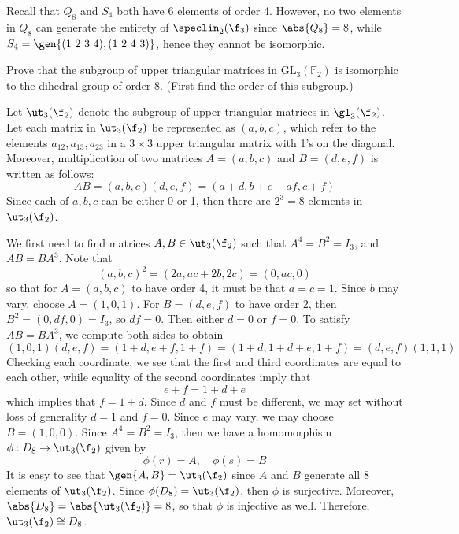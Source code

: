 \begin{sol}
    Recall that $Q_8$ and $S_4$ both have 6 elements of order 4. However, no two elements in $Q_8$ can generate the entirety of $\speclin_2(\f_3)$ since $\abs{Q_8} = 8$, while $S_4 = \gen{(1\ 2\ 3\ 4), (1\ 2\ 4\ 3)}$, hence they cannot be isomorphic.
\end{sol}


\begin{specialexercise}\label{ex2.4.12}
    Prove that the subgroup of upper triangular matrices in $\mathrm{GL}_3(\mathbb{F}_2)$ is isomorphic to the dihedral group of order $8$. (First find the order of this subgroup.)
\end{specialexercise}

\begin{sol}
    Let $\ut_3(\f_2)$ denote the subgroup of upper triangular matrices in $\gl_3(\f_2)$. Let each matrix in $\ut_3(\f_2)$ be represented as $(a, b, c)$, which refer to the elements $a{}_{12}, a_{13}, a_{23}$ in a $3 \times 3$ upper triangular matrix with 1's on the diagonal. Moreover, multiplication of two matrices $A = (a, b, c)$ and $B = (d, e, f)$ is written as follows:
    \[AB = (a, b, c)(d, e, f) = (a + d, b + e + af, c + f)\]
    Since each of $a, b, c$ can be either 0 or 1, then there are $2^3 = 8$ elements in $\ut_3(\f_2)$.

    We first need to find matrices $A, B \in \ut_3(\f_2)$ such that $A^4 = B^2 = I_3$, and $AB = BA^3$. Note that
    \[(a, b, c)^2 = (2a, ac + 2b, 2c) = (0, ac, 0)\]
    so that for $A = (a, b, c)$ to have order 4, it must be that $a = c = 1$. Since $b$ may vary, choose $A = (1, 0, 1)$. For $B = (d, e, f)$ to have order 2, then $B^2 = (0, df, 0) = I_3$, so $df = 0$. Then either $d = 0$ or $f = 0$. To satisfy $AB = BA^3$, we compute both sides to obtain
    \[(1, 0, 1)(d, e, f) = (1 + d, e + f, 1 + f) = (1 + d, 1 + d + e, 1 + f) = (d, e, f)(1, 1, 1)\]
    Checking each coordinate, we see that the first and third coordinates are equal to each other, while equality of the second coordinates imply that
    \[e + f = 1 + d + e\]
    which implies that $f = 1 + d$. Since $d$ and $f$ must be different, we may set without loss of generality $d = 1$ and $f = 0$. Since $e$ may vary, we may choose $B = (1, 0, 0)$. Since $A^4 = B^2 = I_3$, then we have a homomorphism $\phi : D_8 \to \ut_3(\f_2)$ given by
    \[\phi(r) = A, \quad \phi(s) = B\]
    It is easy to see that $\gen{A, B} = \ut_3(\f_2)$ since $A$ and $B$ generate all 8 elements of $\ut_3(\f_2)$. Since $\phi(D_8) = \ut_3(\f_2)$, then $\phi$ is surjective. Moreover, $\abs{D_8} = \abs{\ut_3(\f_2)} = 8$, so that $\phi$ is injective as well. Therefore, $\ut_3(\f_2) \cong D_8$.
\end{sol}

